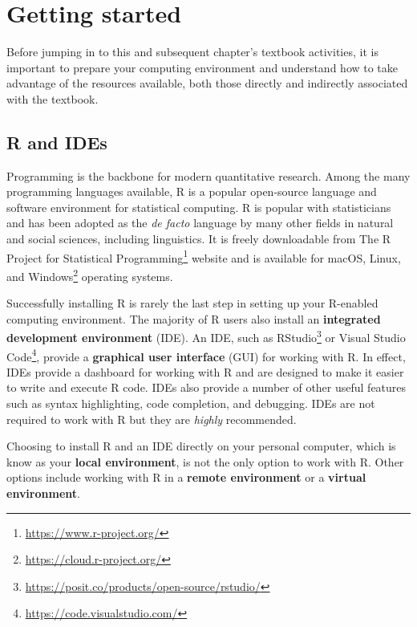 \documentclass[
  letterpaper,
]{latex/krantz}
\theoremstyle{definition}
\theoremstyle{remark}
\DeclareRobustCommand{\href}[2]{#2\footnote{\url{#1}}}
\begin{document}
\section*{Getting started}\label{sec-p-getting-started}


Before jumping in to this and subsequent chapter's textbook activities,
it is important to prepare your computing environment and understand how
to take advantage of the resources available, both those directly and
indirectly associated with the textbook.

\subsection*{R and IDEs}\label{sec-p-r-ides}

Programming is the backbone for modern quantitative research. Among the
many programming languages available, R is a popular open-source
language and software environment for statistical computing. R is
popular with statisticians and has been adopted as the \emph{de facto}
language by many other fields in natural and social sciences, including
linguistics. It is freely downloadable from
\href{https://www.r-project.org/}{The R Project for Statistical
Programming} website and is available for
\href{https://cloud.r-project.org/}{macOS, Linux, and Windows} operating
systems.

Successfully installing R is rarely the last step in setting up your
R-enabled computing environment. The majority of R users also install an
\textbf{integrated development environment} (IDE). An IDE, such as
\href{https://posit.co/products/open-source/rstudio/}{RStudio} or
\href{https://code.visualstudio.com/}{Visual Studio Code}, provide a
\textbf{graphical user interface} (GUI) for working with R. In effect,
IDEs provide a dashboard for working with R and are designed to make it
easier to write and execute R code. IDEs also provide a number of other
useful features such as syntax highlighting, code completion, and
debugging. IDEs are not required to work with R but they are
\emph{highly} recommended.

Choosing to install R and an IDE directly on your personal computer,
which is know as your \textbf{local environment}, is not the only option
to work with R. Other options include working with R in a \textbf{remote
environment} or a \textbf{virtual environment}.
\end{document}
